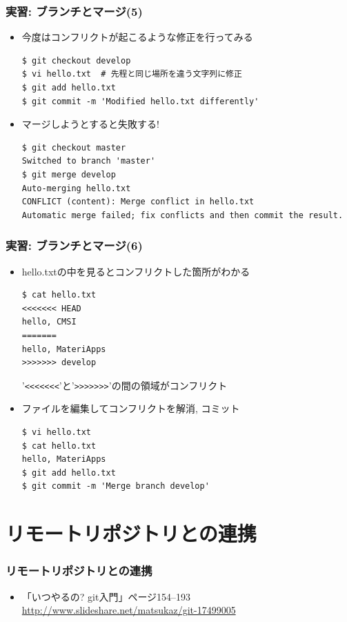 \begin{frame}[t,fragile]
  \frametitle{実習: ブランチとマージ(5)}
  \begin{itemize}
  \item 今度はコンフリクトが起こるような修正を行ってみる
\begin{lstlisting}
$ git checkout develop
$ vi hello.txt  # 先程と同じ場所を違う文字列に修正
$ git add hello.txt
$ git commit -m 'Modified hello.txt differently'
\end{lstlisting}
  \item マージしようとすると失敗する!
\begin{lstlisting}
$ git checkout master
Switched to branch 'master'
$ git merge develop
Auto-merging hello.txt
CONFLICT (content): Merge conflict in hello.txt
Automatic merge failed; fix conflicts and then commit the result.
\end{lstlisting}
  \end{itemize}
\end{frame}

\begin{frame}[t,fragile]
  \frametitle{実習: ブランチとマージ(6)}
  \begin{itemize}
  \item hello.txtの中を見るとコンフリクトした箇所がわかる
\begin{lstlisting}
$ cat hello.txt
<<<<<<< HEAD
hello, CMSI
=======
hello, MateriApps
>>>>>>> develop
\end{lstlisting}
'\verb+<<<<<<<+'と'\verb+>>>>>>>+'の間の領域がコンフリクト \\[.5em]
  \item ファイルを編集してコンフリクトを解消, コミット
\begin{lstlisting}
$ vi hello.txt
$ cat hello.txt
hello, MateriApps
$ git add hello.txt
$ git commit -m 'Merge branch develop'
\end{lstlisting}
  \end{itemize}
\end{frame}

\section{リモートリポジトリとの連携}

\begin{frame}
  \frametitle{リモートリポジトリとの連携}
  \begin{itemize}
  \item 「いつやるの? git入門」ページ154--193 \\
    \url{http://www.slideshare.net/matsukaz/git-17499005}
  \end{itemize}
\end{frame}

